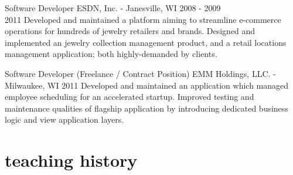 \documentclass[]{fritz-resume}
\begin{document}
\entry
  {Software Developer}
  {ESDN, Inc. - Janesville, WI \vspace{-3mm}}
  {2008 - 2009 \\ 2011}
  {
    Developed and maintained a platform aiming to streamline e-commerce operations for hundreds of jewelry retailers and brands. Designed and implemented an jewelry collection management product, and a retail locations management application; both highly-demanded by clients.
  }

\entry
  {Software Developer (Freelance / Contract Position)}
  {EMM Holdings, LLC. - Milwaukee, WI}
  {2011}
  {
    Developed and maintained an application which managed employee scheduling for an accelerated startup. Improved testing and maintenance qualities of flagship application by introducing dedicated business logic and view application layers.
  }


\pagebreak

\section{teaching history}
\end{document}
